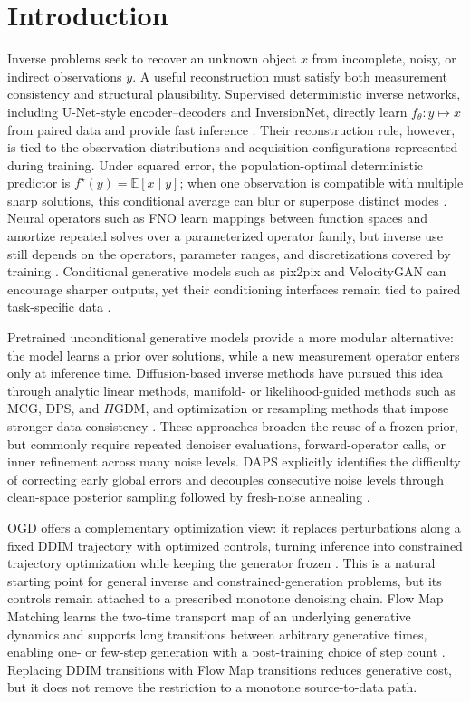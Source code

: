 \documentclass[10pt,twocolumn]{article}
\begin{document}
\section{Introduction}
Inverse problems seek to recover an unknown object $x$ from incomplete, noisy, or indirect observations $y$. A useful reconstruction must satisfy both measurement consistency and structural plausibility. Supervised deterministic inverse networks, including U-Net-style encoder--decoders and InversionNet, directly learn $f_\theta:y\mapsto x$ from paired data and provide fast inference \cite{ronneberger2015unet,wu2019inversionnet}. Their reconstruction rule, however, is tied to the observation distributions and acquisition configurations represented during training. Under squared error, the population-optimal deterministic predictor is $f^\star(y)=\mathbb E[x\mid y]$; when one observation is compatible with multiple sharp solutions, this conditional average can blur or superpose distinct modes \cite{blau2018perception}. Neural operators such as FNO learn mappings between function spaces and amortize repeated solves over a parameterized operator family, but inverse use still depends on the operators, parameter ranges, and discretizations covered by training \cite{li2021fno}. Conditional generative models such as pix2pix and VelocityGAN can encourage sharper outputs, yet their conditioning interfaces remain tied to paired task-specific data \cite{isola2017pix2pix,zhang2019velocitygan}.

Pretrained unconditional generative models provide a more modular alternative: the model learns a prior over solutions, while a new measurement operator enters only at inference time. Diffusion-based inverse methods have pursued this idea through analytic linear methods, manifold- or likelihood-guided methods such as MCG, DPS, and $\Pi$GDM, and optimization or resampling methods that impose stronger data consistency \cite{chung2022mcg,chung2023dps,song2023pigdm,zhu2023diffpir,song2024resample}. These approaches broaden the reuse of a frozen prior, but commonly require repeated denoiser evaluations, forward-operator calls, or inner refinement across many noise levels. DAPS explicitly identifies the difficulty of correcting early global errors and decouples consecutive noise levels through clean-space posterior sampling followed by fresh-noise annealing \cite{zhang2025daps}.

OGD offers a complementary optimization view: it replaces perturbations along a fixed DDIM trajectory with optimized controls, turning inference into constrained trajectory optimization while keeping the generator frozen \cite{ogd2026}. This is a natural starting point for general inverse and constrained-generation problems, but its controls remain attached to a prescribed monotone denoising chain. Flow Map Matching learns the two-time transport map of an underlying generative dynamics and supports long transitions between arbitrary generative times, enabling one- or few-step generation with a post-training choice of step count \cite{boffi2024flowmap}. Replacing DDIM transitions with Flow Map transitions reduces generative cost, but it does not remove the restriction to a monotone source-to-data path.
\end{document}
